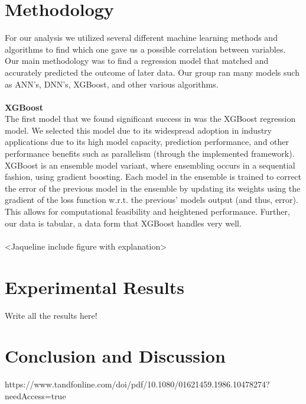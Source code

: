 \documentclass[10pt]{article}
\begin{document}
\section{Methodology}\label{sec:4}
For our analysis we utilized several different machine learning methods and algorithms to find which one gave us a possible correlation between variables. Our main methodology was to find a regression model that matched and accurately predicted the outcome of later data. Our group ran many models such as ANN’s, DNN’s, XGBoost, and other various algorithms. 
\\
\\
\textbf{XGBoost}\\
The first model that we found significant success in was the XGBoost regression model. We selected this model due to its widespread adoption in industry applications due to its high model capacity, prediction performance, and other performance benefits such as parallelism (through the implemented framework).  XGBoost is an ensemble model variant, where ensembling occurs in a sequential fashion, using gradient boosting.  Each model in the ensemble is trained to correct the error of the previous model in the ensemble by updating its weights using the gradient of the loss function w.r.t. the previous’ models output (and thus, error).  This allows for computational feasibility and heightened performance.  Further, our data is tabular, a data form that XGBoost handles very well.
\\
\\
<Jaqueline include figure with explanation>

\newpage

\section{Experimental Results}\label{sec:5}

Write all the results here!

\section{Conclusion and Discussion}\label{sec:6}



 
 
https://www.tandfonline.com/doi/pdf/10.1080/01621459.1986.10478274?needAccess=true
\end{document}
